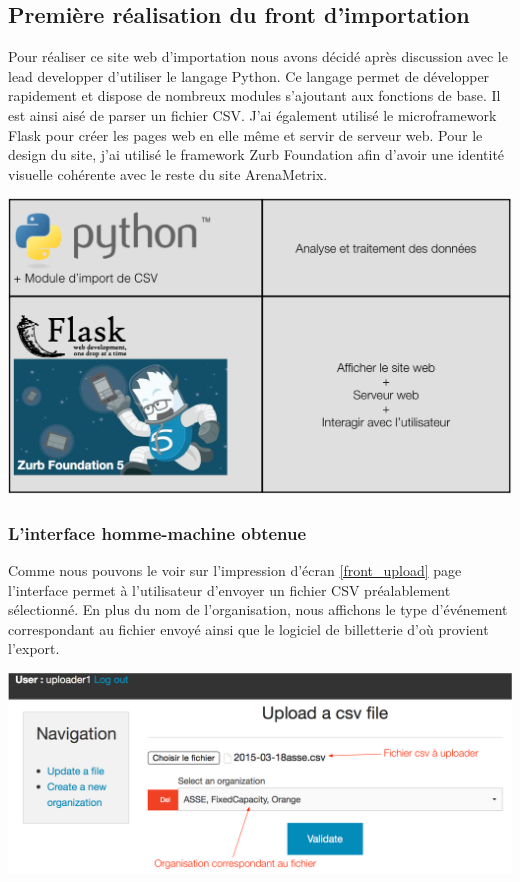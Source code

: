 \subsection{Première réalisation du front d'importation}

Pour réaliser ce site web d'importation nous avons décidé après discussion avec le lead developper d'utiliser le langage Python. Ce langage permet de développer rapidement et dispose de nombreux modules s'ajoutant aux fonctions de base. Il est ainsi aisé de parser un fichier CSV. J'ai également utilisé le microframework Flask pour créer les pages web en elle même et servir de serveur web. Pour le design du site, j'ai utilisé le framework Zurb Foundation afin d'avoir une identité visuelle cohérente avec le reste du site ArenaMetrix. 

\begin{center}
\includegraphics[scale=0.6]{images/datafit2.png}
\label{interface_upload_tech}
\end{center}

\subsubsection{L'interface homme-machine obtenue}

Comme nous pouvons le voir sur l'impression d'écran \ref{front_upload} page \pageref{front_upload} l'interface permet à l'utilisateur d'envoyer un fichier CSV préalablement sélectionné.
En plus du nom de l'organisation, nous affichons le type d'événement correspondant au fichier envoyé ainsi que le logiciel de billetterie d'où provient l'export. \\

\begin{center}
\includegraphics[scale=0.6]{images/front1.png}
\label{front_upload}
\end{center}

